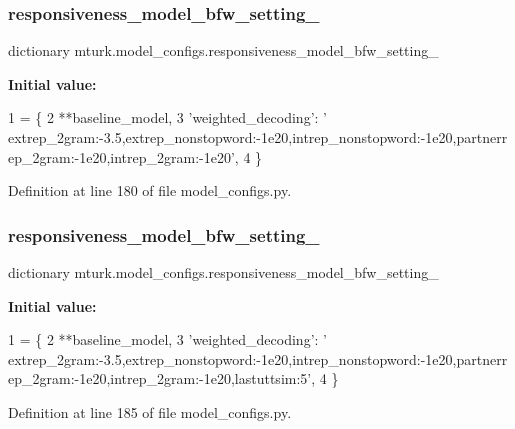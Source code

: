 \subsubsection{\texorpdfstring{responsiveness\+\_\+model\+\_\+bfw\+\_\+setting\+\_}{responsiveness\_model\_bfw\_setting\_00}}
{\footnotesize\ttfamily dictionary mturk.\+model\+\_\+configs.\+responsiveness\+\_\+model\+\_\+bfw\+\_\+setting\+\_}

{\bfseries Initial value\+:}
\begin{DoxyCode}
1 =  \{
2     **baseline\_model,
3     \textcolor{stringliteral}{'weighted\_decoding'}: \textcolor{stringliteral}{'
      extrep\_2gram:-3.5,extrep\_nonstopword:-1e20,intrep\_nonstopword:-1e20,partnerrep\_2gram:-1e20,intrep\_2gram:-1e20'},
4 \}
\end{DoxyCode}


Definition at line 180 of file model\+\_\+configs.\+py.

\mbox{\label{namespacemturk_1_1model__configs_a1c46c269c1d8c50c6dd4a85417a41f91}} 
\subsubsection{\texorpdfstring{responsiveness\+\_\+model\+\_\+bfw\+\_\+setting\+\_}{responsiveness\_model\_bfw\_setting\_05}}
{\footnotesize\ttfamily dictionary mturk.\+model\+\_\+configs.\+responsiveness\+\_\+model\+\_\+bfw\+\_\+setting\+\_}

{\bfseries Initial value\+:}
\begin{DoxyCode}
1 =  \{
2     **baseline\_model,
3     \textcolor{stringliteral}{'weighted\_decoding'}: \textcolor{stringliteral}{'
      extrep\_2gram:-3.5,extrep\_nonstopword:-1e20,intrep\_nonstopword:-1e20,partnerrep\_2gram:-1e20,intrep\_2gram:-1e20,lastuttsim:5'},
4 \}
\end{DoxyCode}


Definition at line 185 of file model\+\_\+configs.\+py.

\mbox{\label{namespacemturk_1_1model__configs_aefb1203efff3c622d1d9c0302abd63a8}} 
